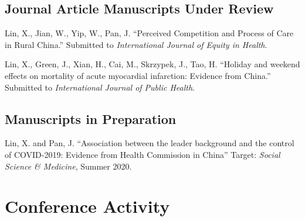 \documentclass[12pt,letterpaper]{report}
\begin{document}
    \subsection*{Journal Article Manuscripts Under Review}

    \begin{tablist}
        
        \item[\the\year] \tab Lin, X., Jian, W., Yip, W., Pan, J. \enquote{Perceived Competition and Process of Care in Rural China.} Submitted to  \textit{International Journal of Equity in Health}.        

        \item[\the\year] \tab Lin, X., Green, J., Xian, H., Cai, M., Skrzypek, J., Tao, H. \enquote{Holiday and weekend effects on mortality of acute myocardial infarction: Evidence from China.} Submitted to  \textit{International Journal of Public Health}.

    \end{tablist}






 
    \subsection*{Manuscripts in Preparation}

    \begin{tablist}
        
		\item[\the\year] \tab Lin, X. and Pan, J. \enquote{Association between the leader background and the control of COVID-2019: Evidence from Health Commission in China} Target: \textit{Social Science \& Medicine}, Summer 2020.
		
     \end{tablist}

    \section*{Conference Activity}
\end{document}
